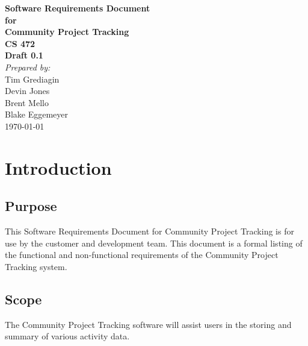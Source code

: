 \documentclass[12pt]{article}
\begin{document}
\begin{titlepage}
\begin{flushright} 
{\LARGE \bfseries Software Requirements Document}\\[1.2cm]
{\large \bfseries for}\\[1.2cm]
{\huge \bfseries Community Project Tracking}\\[1.2cm]
{\large \bfseries CS 472}\\
\vfill
{\large \bfseries Draft 0.1}\\[2cm]
\emph{Prepared by:} \\
Tim Grediagin\\
Devin Jones\\
Brent Mello\\
Blake Eggemeyer \\ [3cm]
{\large \today}
\\[2cm]
\end{flushright}
\end{titlepage}
\setcounter{tocdepth}{3}
\setcounter{secnumdepth}{4}
\tableofcontents
\newpage
\section{Introduction}

\subsection{Purpose}
This Software Requirements Document for Community Project Tracking is for use by the customer and development team. This document is a formal listing of the functional and non-functional requirements of the Community Project Tracking system.

\subsection{Scope}
The Community Project Tracking software will assist users in the storing and summary of various activity data.
\end{document}
